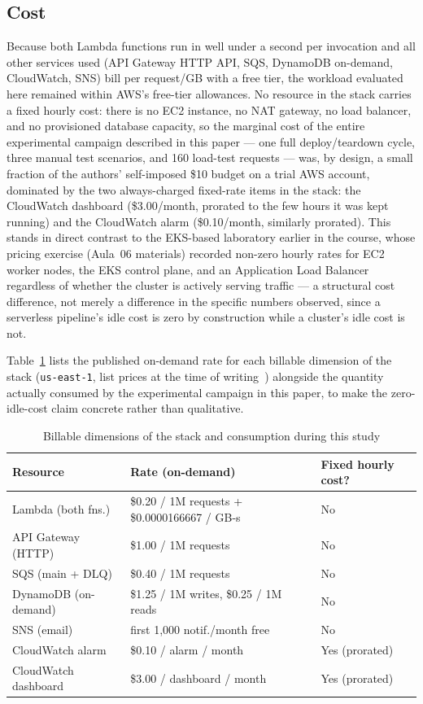 \documentclass[conference]{IEEEtran}
\begin{document}
\subsection{Cost}
Because both Lambda functions run in well under a second per invocation and all other services used (API Gateway HTTP API, SQS, DynamoDB on-demand, CloudWatch, SNS) bill per request/GB with a free tier, the workload evaluated here remained within AWS's free-tier allowances. No resource in the stack carries a fixed hourly cost: there is no EC2 instance, no NAT gateway, no load balancer, and no provisioned database capacity, so the marginal cost of the entire experimental campaign described in this paper --- one full deploy/teardown cycle, three manual test scenarios, and 160 load-test requests --- was, by design, a small fraction of the authors' self-imposed \$10 budget on a trial AWS account, dominated by the two always-charged fixed-rate items in the stack: the CloudWatch dashboard (\$3.00/month, prorated to the few hours it was kept running) and the CloudWatch alarm (\$0.10/month, similarly prorated). This stands in direct contrast to the EKS-based laboratory earlier in the course, whose pricing exercise (Aula~06 materials) recorded non-zero hourly rates for EC2 worker nodes, the EKS control plane, and an Application Load Balancer regardless of whether the cluster is actively serving traffic --- a structural cost difference, not merely a difference in the specific numbers observed, since a serverless pipeline's idle cost is zero by construction while a cluster's idle cost is not.

Table~\ref{tab:cost} lists the published on-demand rate for each billable dimension of the stack (\texttt{us-east-1}, list prices at the time of writing~\cite{awspricing}) alongside the quantity actually consumed by the experimental campaign in this paper, to make the zero-idle-cost claim concrete rather than qualitative.

\begin{table}[htbp]
\caption{Billable dimensions of the stack and consumption during this study}
\label{tab:cost}
\centering
\begin{tabular}{p{2.1cm}p{2.9cm}p{1.6cm}}
\toprule
\textbf{Resource} & \textbf{Rate (on-demand)} & \textbf{Fixed hourly cost?} \\
\midrule
Lambda (both fns.) & \$0.20 / 1M requests + \$0.0000166667 / GB-s & No \\
API Gateway (HTTP) & \$1.00 / 1M requests & No \\
SQS (main + DLQ) & \$0.40 / 1M requests & No \\
DynamoDB (on-demand) & \$1.25 / 1M writes, \$0.25 / 1M reads & No \\
SNS (email) & first 1{,}000 notif./month free & No \\
CloudWatch alarm & \$0.10 / alarm / month & Yes (prorated) \\
CloudWatch dashboard & \$3.00 / dashboard / month & Yes (prorated) \\
\bottomrule
\end{tabular}
\end{table}
\end{document}
